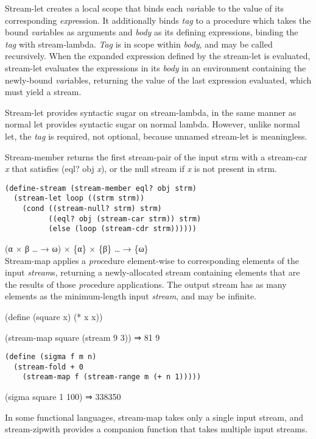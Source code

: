 \begin{entry}{%
  }


  Stream-let creates a local scope that binds each \emph{var}iable
  \emph{} to the value of its corresponding \emph{expr}ession. It
  additionally binds \emph{tag} to a procedure which takes the bound
  \emph{var}iables as arguments and \emph{body} as its defining
  expressions, binding the \emph{tag} with stream-lambda. \emph{Tag}
  is in scope within \emph{body}, and may be called recursively. When
  the expanded expression defined by the stream-let is evaluated,
  stream-let evaluates the expressions in its \emph{body} in an
  environment containing the newly-bound \emph{var}iables, returning
  the value of the last expression evaluated, which must yield a
  stream.

  Stream-let provides syntactic sugar on stream-lambda, in the same
  manner as normal let provides syntactic sugar on normal
  lambda. However, unlike normal let, the \emph{tag} is required, not
  optional, because unnamed stream-let is meaningless.

  Stream-member returns the first stream-pair of the input strm with a
  stream-car \emph{x} that satisfies (eql? obj \emph{x}), or the null
  stream if \emph{x} is not present in strm.

\begin{verbatim}
(define-stream (stream-member eql? obj strm)
  (stream-let loop ((strm strm))
    (cond ((stream-null? strm) strm)
          ((eql? obj (stream-car strm)) strm)
          (else (loop (stream-cdr strm))))))
\end{verbatim}
\end{entry}

\begin{entry}{%
  }

  (α × β \ldots{} → ω) × \{α\} × \{β\} \ldots{} → \{ω\}\\
  Stream-map applies a \emph{proc}edure element-wise to corresponding
  elements of the input \emph{stream}s, returning a newly-allocated
  stream containing elements that are the results of those
  \emph{proc}edure applications. The output stream has as many
  elements as the minimum-length input \emph{stream}, and may be
  infinite.

  (define (square x) (* x x))

  (stream-map square (stream 9 3)) ⇒ 81 9

\begin{verbatim}
(define (sigma f m n)
  (stream-fold + 0
    (stream-map f (stream-range m (+ n 1)))))
\end{verbatim}

  (sigma square 1 100) ⇒ 338350

  In some functional languages, stream-map takes only a single input
  stream, and stream-zipwith provides a companion function that takes
  multiple input streams.
\end{entry}

